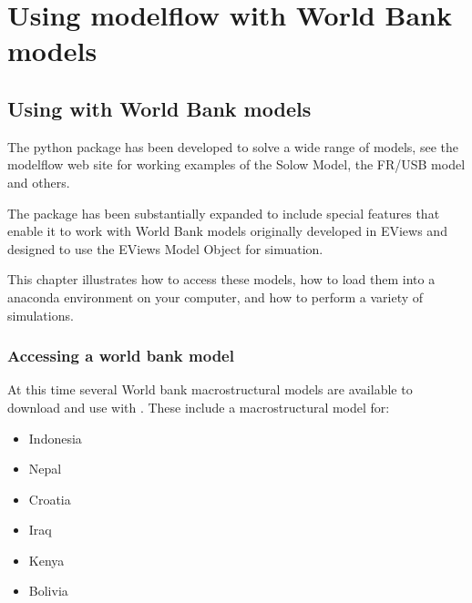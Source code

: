 \documentclass[letterpaper,10pt,english]{jupyterBook}
\begin{document}
\part{Using modelflow with World Bank models}

\sphinxstepscope


\chapter{Using  with World Bank models}
\label{\detokenize{content/05_WBModels/LoadingWBModel:using-modelflow-with-world-bank-models}}\label{\detokenize{content/05_WBModels/LoadingWBModel::doc}}
\sphinxAtStartPar
The  python package has been developed to solve a wide range of models, see the modelflow  web site for working examples of the Solow Model, the FR/USB model and others.

\sphinxAtStartPar
The package has been substantially expanded to include special features that enable it to work with World Bank models originally developed in EViews and designed to use the EViews Model Object for simuation.

\sphinxAtStartPar
This chapter illustrates how to access these models, how to load them into a  anaconda environment on your computer, and how to perform a variety of simulations.


\section{Accessing a world bank model}
\label{\detokenize{content/05_WBModels/LoadingWBModel:accessing-a-world-bank-model}}
\sphinxAtStartPar
At this time several World bank macrostructural models are available to download and use with .  These include a macrostructural model for:
\begin{itemize}
\item {} 
\sphinxAtStartPar
Indonesia

\item {} 
\sphinxAtStartPar
Nepal

\item {} 
\sphinxAtStartPar
Croatia

\item {} 
\sphinxAtStartPar
Iraq

\item {} 
\sphinxAtStartPar
Kenya

\item {} 
\sphinxAtStartPar
Bolivia

\end{itemize}
\end{document}
